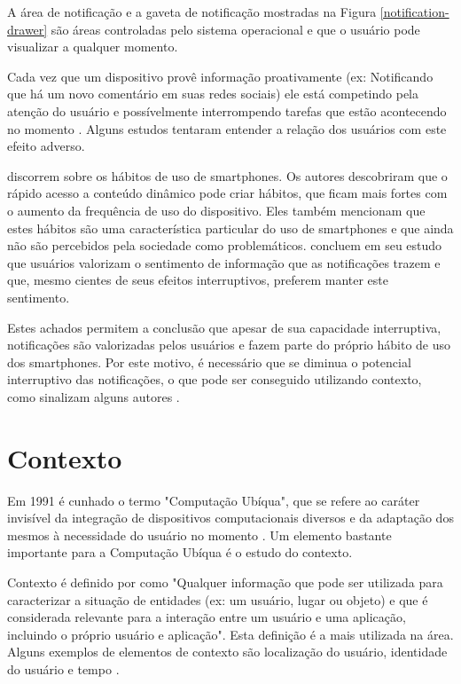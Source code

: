 A área de notificação e a gaveta de notificação mostradas na Figura \ref{notification-drawer} são áreas controladas pelo
sistema operacional e que o usuário pode visualizar a qualquer momento.

Cada vez que um dispositivo provê informação proativamente (ex: Notificando que há um novo comentário em suas redes
sociais) ele está competindo pela atenção do usuário e possívelmente interrompendo tarefas que estão acontecendo no momento
\cite{ho2005using}. Alguns estudos tentaram entender a relação dos usuários com este efeito adverso.

 discorrem sobre os hábitos de uso de smartphones. Os autores descobriram que o rápido acesso a
conteúdo dinâmico pode criar hábitos, que ficam mais fortes com o aumento da frequência de uso do dispositivo. Eles
também mencionam que estes hábitos são uma característica particular do uso de smartphones e que ainda não são percebidos
pela sociedade como problemáticos.  concluem em seu estudo que usuários valorizam o sentimento
de informação que as notificações trazem e que, mesmo cientes de seus efeitos interruptivos, preferem manter este sentimento.

Estes achados permitem a conclusão que apesar de sua capacidade interruptiva, notificações são valorizadas pelos
usuários e fazem parte do próprio hábito de uso dos smartphones. Por este motivo, é necessário que se diminua o potencial
interruptivo das notificações, o que pode ser conseguido utilizando contexto, como sinalizam alguns autores
\cite{ho2005using, kern2003context, iqbal2010notifications}.

\section{Contexto}
\label{contexto}

Em 1991 é cunhado o termo "Computação Ubíqua", que se refere ao caráter invisível da integração de dispositivos
computacionais diversos e da adaptação dos mesmos à necessidade do usuário no momento \cite{weiser1991computer}.
Um elemento bastante importante para a Computação Ubíqua é o estudo do contexto.

Contexto é definido por  como "Qualquer informação que pode ser utilizada para
caracterizar a situação de entidades (ex: um usuário, lugar ou objeto) e que é considerada relevante para
a interação entre um usuário e uma aplicação, incluindo o próprio usuário e aplicação". Esta definição é
a mais utilizada na área. Alguns exemplos de elementos de contexto são
localização do usuário, identidade do usuário e tempo \cite{ryan1999enhanced}.

